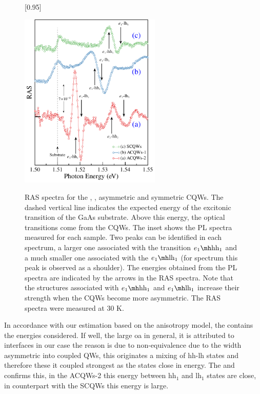 \begin{figure}[H]
	[0.95\FBwidth]
	{\caption{RAS spectra for the , , asymmetric and  symmetric CQWs. The dashed vertical line indicates the expected energy of the excitonic transition of the GaAs substrate. Above this energy, the optical transitions come from the CQWs. The inset shows the PL spectra measured for each sample. Two peaks can be identified in each spectrum, a larger one associated with the transition $\thh{1}{1}$ and a much smaller one associated with the $\tlh{1}{1}$ (for spectrum  this peak is observed as a shoulder). The energies obtained from the PL spectra are indicated by the arrows in the RAS spectra. Note that the structures associated with $\thh{1}{1}$ and $\tlh{1}{1}$ increase their strength when the CQWs become more asymmetric. The RAS spectra were measured at 30 K.
	}\label{fig:chapter-3-subsec-ras-plots-set-3}}
	{
	\includegraphics[width=0.6\textwidth]{../figures/chapter-3/ras-plots/build-ruco/ras-set-3.pdf}
	\label{subfig:chapter-3-subsubsec-ras-strength-set-3-a}
	\label{subfig:chapter-3-subsubsec-ras-strength-set-3-b}
	\label{subfig:chapter-3-subsubsec-ras-strength-set-3-c}
	}
\end{figure}
In accordance with our estimation based on the anisotropy model, the  contains the energies considered. If well, the large \gls{oa}  in general, it is attributed to interfaces in our case the reason is due to non-equivalence due to the width asymmetric into coupled QWs, this originates a mixing of hh-lh states and therefore these it coupled strongest as the states close in energy\cite{winkler2003spin}. The  and  confirms this, in the ACQWs-2 this energy between $\mathrm{hh_1}$ and $\mathrm{lh_1}$ states are close, in counterpart with the  SCQWs  this energy is large.\\

